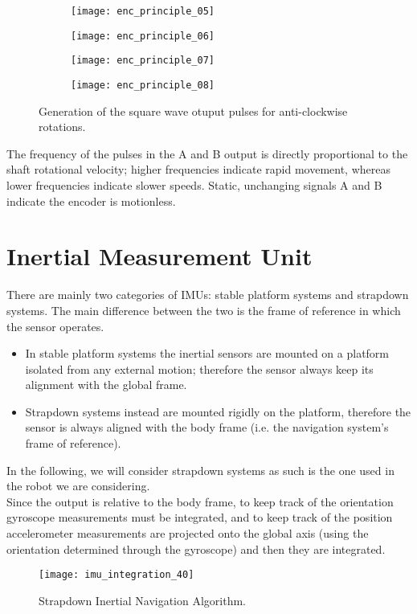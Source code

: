 \begin{figure}[htb]
 \centering
	\begin{subfigure}{0.2\textwidth}
		\texttt{[image: enc\_principle\_05]}
	\end{subfigure}\hfil
	\begin{subfigure}{0.2\textwidth}
		\texttt{[image: enc\_principle\_06]}
	\end{subfigure}\hfil
	\begin{subfigure}{0.2\textwidth}
		\texttt{[image: enc\_principle\_07]}
	\end{subfigure}\hfil
	\begin{subfigure}{0.2\textwidth}
		\texttt{[image: enc\_principle\_08]}
	\end{subfigure}
	\captionsetup{justification=centering, margin=1.5cm}
	\caption{Generation of the square wave otuput pulses for anti-clockwise rotations.}
\end{figure}

The frequency of the pulses in the A and B output is directly proportional to the shaft rotational velocity; higher frequencies indicate rapid movement, whereas lower frequencies indicate slower speeds. Static, unchanging signals A and B indicate the encoder is motionless.



\section{Inertial Measurement Unit}

There are mainly two categories of IMUs: stable platform systems and strapdown systems. The main difference between the two is the frame of reference in which the sensor operates.
\begin{itemize}
	\item In stable platform systems the inertial sensors are mounted on a platform isolated from any external motion; therefore the sensor always keep its alignment with the global frame.
	\item Strapdown systems instead are mounted rigidly on the platform, therefore the sensor is always aligned with the body frame (i.e. the navigation system's frame of reference).
\end{itemize}
In the following, we will consider strapdown systems as such is the one used in the robot we are considering.\\
Since the output is relative to the body frame, to keep track of the orientation gyroscope measurements must be integrated, and to keep track of the position accelerometer measurements are projected onto the global axis (using the orientation determined through the gyroscope) and then they are integrated\label{imu_integration}.\supercite{intro_inertial_navigation}
\begin{figure}[!ht]
	\texttt{[image: imu\_integration\_40]}
	\captionsetup{justification=centering, margin=1.5cm}
	\centering
	\caption{Strapdown Inertial Navigation Algorithm.}
	\centering
\end{figure}



